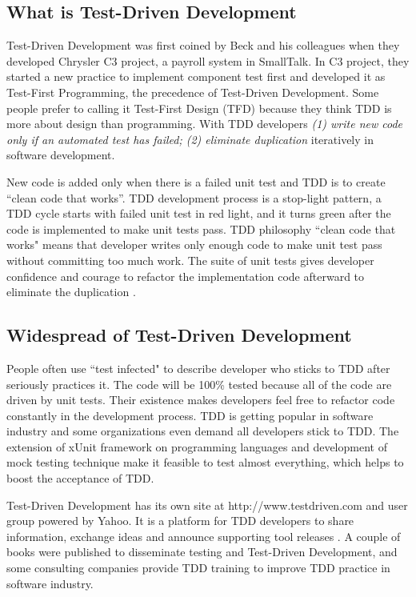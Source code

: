 \subsection{What is Test-Driven Development}
Test-Driven Development was first coined by Beck and his colleagues when
they developed Chrysler C3 project, a payroll system in SmallTalk. In C3
project, they started a new practice to implement component test first and
developed it as Test-First Programming, the precedence of Test-Driven
Development. Some people prefer to calling it Test-First Design (TFD)
because they think TDD is more about design than programming. With TDD
developers \textit{(1) write new code only if an automated test has failed;
  (2) eliminate duplication} iteratively in software
development\cite{Beck:03}.

New code is added only when there is a failed unit test and TDD is to
create ``clean code that works''\cite{Beck:03}. TDD development process is
a stop-light pattern, a TDD cycle starts with failed unit test in red
light, and it turns green after the code is implemented to make unit tests
pass. TDD philosophy ``clean code that works" means that developer writes
only enough code to make unit test pass without committing too much work.
The suite of unit tests gives developer confidence and courage to refactor
the implementation code afterward to eliminate the duplication
\cite{Beck:03}.

\subsection{Widespread of Test-Driven Development}
People often use ``test infected"
\cite{TestInfected,ObjectMentorTDD,MasonBlog,EichertBlog} to describe
developer who sticks to TDD after seriously practices it. The code will be
100\% tested because all of the code are driven by unit tests. Their
existence makes developers feel free to refactor code constantly in the
development process. TDD is getting popular in software industry and some
organizations even demand all developers stick to TDD.  The extension of
xUnit framework on programming languages and development of mock testing
technique make it feasible to test almost everything, which helps to boost
the acceptance of TDD.

Test-Driven Development has its own site at http://www.testdriven.com and
user group powered by Yahoo\cite{TddYahooGroup}.  It is a platform for TDD
developers to share information, exchange ideas and announce supporting
tool releases \cite{TestDrivenWeb}. A couple of books
\cite{Beck:03,Astels:03,Link:03,Andy&Dave:03} were published to disseminate
testing and Test-Driven Development, and some consulting companies provide
TDD
training\cite{AdaptionTddWorkshop,IndustrialLogicTddWorkshop,BENUGWorkshop:04,ClarkwareWorkshop:04,OsheroveWorkshop:04}
to improve TDD practice in software industry.

